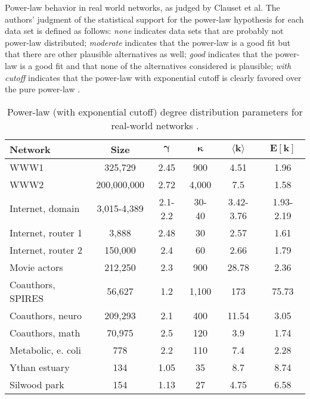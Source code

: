 \begin{table}[!htp]
\caption[Power-law behavior in real world networks]{\label{tab:ch1:degreedist1}Power-law behavior in real world networks, as judged by Clauset et al. The authors' judgment of the statistical support for the power-law hypothesis for each data set is defined as follows: \emph{none} indicates data sets that are probably not power-law distributed; \emph{moderate} indicates that the power-law is a good fit but that there are other plausible alternatives as well; \emph{good} indicates that the power-law is a good fit and that none of the alternatives considered is plausible; \emph{with cutoff} indicates that the power-law with exponential cutoff is clearly favored over the pure power-law \cite{Clauset2009}.}

\end{table}



\begin{table}[!htp]
\centering

\begin{tabular}{lccccc}
\toprule

\textbf{Network} & \textbf{Size} & $\mathbf{\gamma}$ & $\mathbf{\kappa}$ & $\mathbf{\langle k \rangle}$ & $\mathbf{E[k]}$\\
\midrule
%
WWW1 & 325,729 & 2.45 & 900 & 4.51 & 1.96\\
WWW2 & 200,000,000 & 2.72 & 4,000 & 7.5 & 1.58\\
Internet, domain & 3,015-4,389 & 2.1-2.2 & 30-40 & 3.42-3.76 & 1.93-2.19\\
Internet, router 1 & 3,888 & 2.48 & 30 & 2.57 & 1.61\\
Internet, router 2 & 150,000 & 2.4 & 60 & 2.66 & 1.79\\
Movie actors & 212,250 & 2.3 & 900 & 28.78 & 2.36\\
Coauthors, SPIRES & 56,627 & 1.2 & 1,100 & 173 & 75.73\\
Coauthors, neuro & 209,293 & 2.1 & 400 & 11.54 & 3.05\\
Coauthors, math & 70,975 & 2.5 & 120 & 3.9 & 1.74\\
Metabolic, e. coli & 778 & 2.2 & 110 & 7.4 & 2.28\\
Ythan estuary & 134 & 1.05 & 35 & 8.7 & 8.74\\
Silwood park & 154 & 1.13 & 27 & 4.75 & 6.58\\
%
\bottomrule

\end{tabular}

\caption[Degree distribution parameters for real-world networks.]{\label{tab:ch1:degreedist2}Power-law (with exponential cutoff) degree distribution parameters for real-world networks \cite{Albert2002}.}
\end{table}

